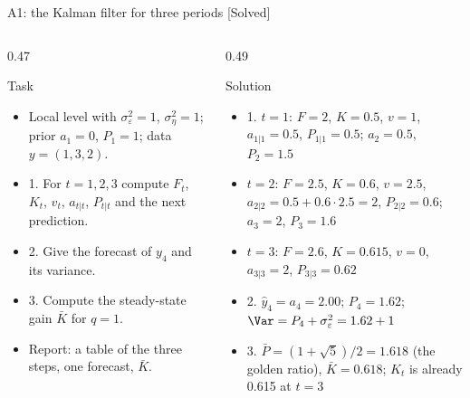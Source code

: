 \begin{frame}{A1: the Kalman filter for three periods [Solved]}
\itemsize{\scriptsize}
\begin{columns}[T]
\begin{column}{0.47\textwidth}
\begin{block}{Task}
\begin{itemize}
    \item Local level with $\sigma^2_\varepsilon = 1$, $\sigma^2_\eta = 1$; prior $a_1 = 0$, $P_1 = 1$; data $y = (1, 3, 2)$.
    \item 1. For $t = 1, 2, 3$ compute $F_t$, $K_t$, $v_t$, $a_{t|t}$, $P_{t|t}$ and the next prediction.
    \item 2. Give the forecast of $y_4$ and its variance.
    \item 3. Compute the steady-state gain $\bar K$ for $q = 1$.
    \item Report: a table of the three steps, one forecast, $\bar K$.
\end{itemize}
\end{block}
\end{column}
\begin{column}{0.49\textwidth}
\begin{exampleblock}{Solution}
\begin{itemize}
    \item 1. $t = 1$: $F = 2$, $K = 0.5$, $v = 1$, $a_{1|1} = 0.5$, $P_{1|1} = 0.5$; $a_2 = 0.5$, $P_2 = 1.5$
    \item $t = 2$: $F = 2.5$, $K = 0.6$, $v = 2.5$, $a_{2|2} = 0.5 + 0.6 \cdot 2.5 = 2$, $P_{2|2} = 0.6$; $a_3 = 2$, $P_3 = 1.6$
    \item $t = 3$: $F = 2.6$, $K = 0.615$, $v = 0$, $a_{3|3} = 2$, $P_{3|3} = 0.62$
    \item 2. $\hat y_4 = a_4 = 2.00$; $P_4 = 1.62$; $\Var = P_4 + \sigma^2_\varepsilon = 1.62 + 1$
    \item 3. $\bar P = (1 + \sqrt5)/2 = 1.618$ (the golden ratio), $\bar K = 0.618$; $K_t$ is already 0.615 at $t = 3$
\end{itemize}
\end{exampleblock}
\end{column}
\end{columns}
\end{frame}

